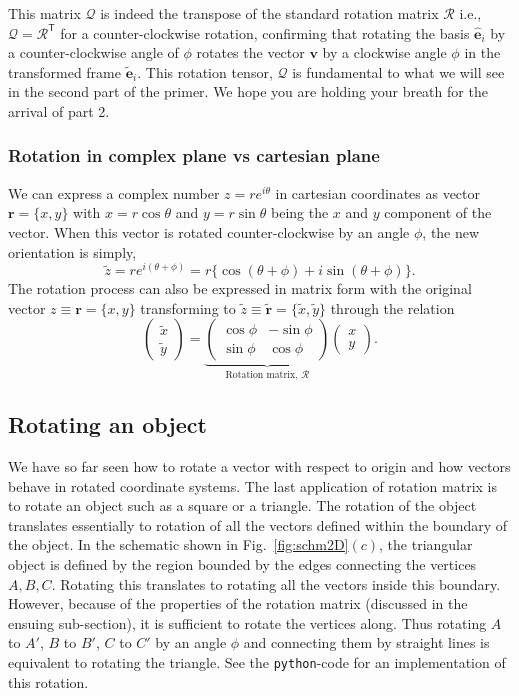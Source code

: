\documentclass{article}
\def\eh{\hat{\mathbf{e}}}
\def\et{\tilde{\mathbf{e}}}
\def\r{\mathbf{r}}
\def\rt{\tilde{\mathbf{r}}}
\def\zt{\tilde{z}}
\def\xt{\tilde{x}}
\def\yt{\tilde{y}}
\def\v{\mathbf{v}}
\def\R{\mathcal{R}}
\def\Q{\mathcal{Q}}
\def\T{\mathsf{T}}
\begin{document}
\noindent This matrix $\Q$ is indeed the transpose of the standard rotation matrix $\R$ i.e., $\Q = \R^\T$ for a counter-clockwise rotation, confirming that rotating the basis $\eh_i$ by a counter-clockwise angle of $\phi$ rotates the vector $\v$ by a clockwise angle $\phi$ in the transformed frame $\et_i$. This rotation tensor, $\Q$ is fundamental to what we will see in the second part of the primer. We hope you are holding your breath for the arrival of part 2.

\subsubsection*{Rotation in complex plane vs cartesian plane}
We can express a complex number $z = re^{i\theta}$ in cartesian coordinates as vector $\r = \{ x, y\}$ with $x = r\cos\theta$ and $y = r\sin\theta$ being the $x$ and $y$ component of the vector. When this vector is rotated counter-clockwise by an angle \( \phi \), the new orientation is simply,
\[
  \zt = re^{i(\theta + \phi)} = r\{\cos(\theta + \phi) + i\sin(\theta + \phi)\}.
\]
\noindent The rotation process can also be expressed in matrix form with the original vector $z \equiv \r = \{x, y\}$ transforming to $\zt \equiv \rt = \{ \xt, \yt\}$ through the relation
\[
  \begin{pmatrix}
    \xt \\
    \yt
  \end{pmatrix} =
  \underbrace{
  \begin{pmatrix}
    \cos\phi & -\sin\phi \\
    \sin\phi & \cos\phi
  \end{pmatrix}}_{\text{Rotation matrix, }\R}
  \begin{pmatrix}
    x \\
    y
  \end{pmatrix}.
\]


\subsection{Rotating an object}
We have so far seen how to rotate a vector with respect to origin and how vectors behave in rotated coordinate systems. The last application of rotation matrix is to rotate an object such as a square or a triangle. The rotation of the object translates essentially to rotation of all the vectors defined within the boundary of the object. In the schematic shown in Fig.~\ref{fig:schm2D}$(c)$, the triangular object is defined by the region bounded by the edges connecting the vertices $A, B, C$. Rotating this translates to rotating all the vectors inside this boundary. However, because of the properties of the rotation matrix (discussed in the ensuing sub-section), it is sufficient to rotate the vertices along. Thus rotating $A$ to $A'$, $B$ to $B'$, $C$ to $C'$ by an angle $\phi$ and connecting them by straight lines is equivalent to rotating the triangle. See the \texttt{python}-code for an implementation of this rotation.
\end{document}
